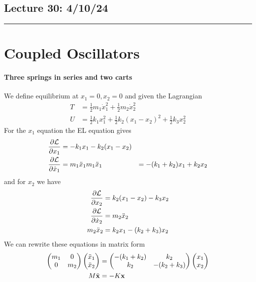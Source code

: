 \documentclass[../main.tex]{subfiles}
\begin{document}
\subsection*{Lecture 30: \hfill  4/10/24}
\hrule \vspace{10px}
\section{Coupled Oscillators}
\paragraph*{Three springs in series and two carts}
We define equilibrium at $x_1 = 0, x_2 = 0$ and given the Lagrangian
\begin{align*}
    T &= \frac{1}{2}m_1\dot{x}_1^2 + \frac{1}{2}m_2\dot{x}_2^2 \\
    U &= \frac{1}{2}k_1 x_1^2 + \frac{1}{2} k_2 (x_1 - x_2)^2 + \frac{1}{2} k_3 x_2^2
\end{align*}
For the $x_1$ equation the EL equation gives
\begin{align*}
    \pdv{\mathcal{L}}{x_1} &= - k_1 x_1 - k_2(x_1 - x_2) \\
    \pdv{\mathcal{L}}{\dot x_1} &= m_1 \ddot{x}_1
    m_1 \ddot x_1 &= - (k_1 + k_2) x_1 + k_2 x_2
\end{align*}
and for $x_2$ we have
\begin{align*}
    \pdv{\mathcal{L}}{x_2} &= k_2(x_1 - x_2) - k_3 x_2 \\
    \pdv{\mathcal{L}}{\dot x_2} &= m_2 \ddot{x}_2 \\
    m_2 \ddot x_2 &= k_2 x_1 - (k_2 + k_3) x_2
\end{align*}
We can rewrite these equations in matrix form
\begin{align*}
    \begin{pmatrix}
        m_1 & 0 \\
        0 & m_2
    \end{pmatrix}
    \begin{pmatrix}
        \ddot x_1 \\
        \ddot x_2
    \end{pmatrix}
    &=
    \begin{pmatrix}
        - (k_1 + k_2) & k_2 \\
        k_2 & - (k_2 + k_3)
    \end{pmatrix}
    \begin{pmatrix}
        x_1 \\
        x_2
    \end{pmatrix}
    \\
    M \ddot{\vb x} &= -K \vb x
\end{align*}
\end{document}
